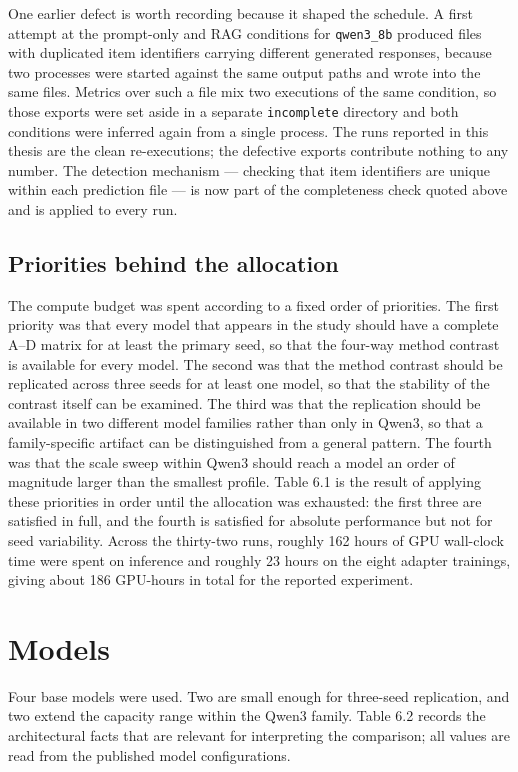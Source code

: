 One earlier defect is worth recording because it shaped the schedule. A first attempt at the prompt-only and RAG conditions for \texttt{qwen3\_8b} produced files with duplicated item identifiers carrying different generated responses, because two processes were started against the same output paths and wrote into the same files. Metrics over such a file mix two executions of the same condition, so those exports were set aside in a separate \texttt{incomplete} directory and both conditions were inferred again from a single process. The runs reported in this thesis are the clean re-executions; the defective exports contribute nothing to any number. The detection mechanism --- checking that item identifiers are unique within each prediction file --- is now part of the completeness check quoted above and is applied to every run.

\subsection{Priorities behind the allocation}

The compute budget was spent according to a fixed order of priorities. The first priority was that every model that appears in the study should have a complete A--D matrix for at least the primary seed, so that the four-way method contrast is available for every model. The second was that the method contrast should be replicated across three seeds for at least one model, so that the stability of the contrast itself can be examined. The third was that the replication should be available in two different model families rather than only in Qwen3, so that a family-specific artifact can be distinguished from a general pattern. The fourth was that the scale sweep within Qwen3 should reach a model an order of magnitude larger than the smallest profile. Table 6.1 is the result of applying these priorities in order until the allocation was exhausted: the first three are satisfied in full, and the fourth is satisfied for absolute performance but not for seed variability. Across the thirty-two runs, roughly 162 hours of GPU wall-clock time were spent on inference and roughly 23 hours on the eight adapter trainings, giving about 186 GPU-hours in total for the reported experiment.

\section{Models}

Four base models were used. Two are small enough for three-seed replication, and two extend the capacity range within the Qwen3 family. Table 6.2 records the architectural facts that are relevant for interpreting the comparison; all values are read from the published model configurations.

